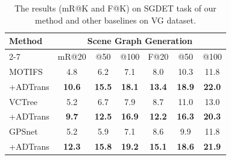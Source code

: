 \documentclass[letterpaper]{article} %
\begin{document}
\begin{table}[]
\tabcolsep=0.1cm

\begin{tabular}{l|cccccc}
\hline
\multirow{2}{*}{Method} & \multicolumn{6}{c}{Scene Graph Generation}                                                                         \\ \cline{2-7}
                        & mR@20         & @50         & \multicolumn{1}{c|}{@100}        & F@20          & @50          & @100         \\ \hline
MOTIFS                  & 4.8           & 6.2           & \multicolumn{1}{c|}{7.1}           & 8.0           & 10.3          & 11.8          \\
\quad +ADTrans                & \textbf{10.6} & \textbf{15.5} & \multicolumn{1}{c|}{\textbf{18.1}} & \textbf{13.4} & \textbf{18.9} & \textbf{22.0} \\ \hline
VCTree                  & 5.2           & 6.7           & \multicolumn{1}{c|}{7.9}           & 8.7           & 11.0          & 13.0          \\
\quad +ADTrans                & \textbf{9.7}  & \textbf{12.5} & \multicolumn{1}{c|}{\textbf{16.9}} & \textbf{12.2} & \textbf{16.3} & \textbf{20.3} \\ \hline
GPSnet                  & 5.2           & 5.9           & \multicolumn{1}{c|}{7.1}           & 8.6           & 9.9           & 11.8          \\
\quad +ADTrans                & \textbf{12.3} & \textbf{15.8} & \multicolumn{1}{c|}{\textbf{19.2}} & \textbf{15.1} & \textbf{18.6} & \textbf{21.9} \\ \hline
\end{tabular}
\caption{The results (mR@K and F@K) on SGDET task of our method and other baselines on VG dataset.}
\label{sgdet}
\end{table}
\end{document}
